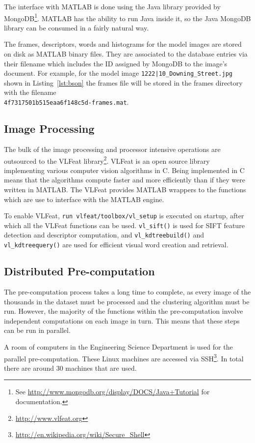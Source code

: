 \documentclass[11pt, onecolumn, a4paper, final]{report} %
\begin{document}
The interface with MATLAB is done using the Java library provided by MongoDB\footnote{See \url{http://www.mongodb.org/display/DOCS/Java+Tutorial} for documentation.}. MATLAB has the ability to run Java inside it, so the Java MongoDB library can be consumed in a fairly natural way.

The frames, descriptors, words and histograms for the model images are stored on disk as MATLAB binary files. They are associated to the database entries via their filename which includes the ID assigned by MongoDB to the image's document. For example, for the model image \lstinline!1222|10_Downing_Street.jpg! shown in Listing~\ref{lst:bson} the frames file will be stored in the frames directory with the filename \\ \lstinline!4f7317501b515eaa6f148c5d-frames.mat!.

\subsection{Image Processing}
The bulk of the image processing and processor intensive operations are outsourced to the VLFeat library\footnote{\url{http://www.vlfeat.org}}. VLFeat is an open source library implementing various computer vision algorithms in C. Being implemented in C means that the algorithms compute faster and more efficiently than if they were written in MATLAB. The VLFeat provides MATLAB wrappers to the functions which are use to interface with the MATLAB engine.

\lstset{language=Matlab}
To enable VLFeat, \lstinline!run vlfeat/toolbox/vl_setup! is executed on startup, after which all the VLFeat functions can be used. \lstinline!vl_sift()! is used for SIFT feature detection and descriptor computation, and \lstinline!vl_kdtreebuild()! and \lstinline!vl_kdtreequery()! are used for efficient visual word creation and retrieval.

\subsection{Distributed Pre-computation}
The pre-computation process takes a long time to complete, as every image of the thousands in the dataset must be processed and the clustering algorithm must be run. However, the majority of the functions within the pre-computation involve independent computations on each image in turn. This means that these steps can be run in parallel.

A room of computers in the Engineering Science Department is used for the parallel pre-computation. These Linux machines are accessed via SSH\footnote{\url{http://en.wikipedia.org/wiki/Secure_Shell}}. In total there are around 30 machines that are used.
\end{document}
